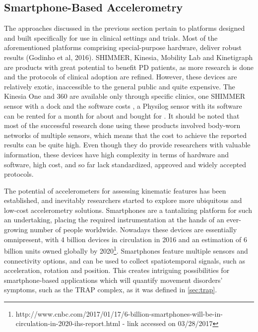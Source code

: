 
\subsection{Smartphone-Based Accelerometry}
\label{subsec:smartphones}
The approaches discussed in the previous section pertain to platforms designed and built specifically for use in clinical settings and trials. Most of the aforementioned platforms comprising special-purpose hardware, deliver robust results (Godinho et al, 2016). \gls{SHIMMER}, Kinesia, Mobility Lab and Kinetigraph are products with great potential to benefit \gls{PD} patients, as more research is done and the protocols of clinical adoption are refined. However, these devices are relatively exotic, inaccessible to the general public and quite expensive. The Kinesia One and 360 are available only through specific clinics, one \gls{SHIMMER} sensor with a dock and the software costs , a Physilog sensor with its software can be rented for a month for about  and bought for . It should be noted that most of the successful research done using these products involved body-worn networks of multiple sensors, which means that the cost to achieve the reported results can be quite high. Even though they do provide researchers with valuable information, these devices have high complexity in terms of hardware and software, high cost, and so far lack standardized, approved and widely accepted protocols.

The potential of accelerometers for assessing kinematic features has been established, and inevitably researchers started to explore more ubiquitous and low-cost accelerometry solutions. Smartphones are a tantalizing platform for such an undertaking, placing the required instrumentation at the hands of an ever-growing number of people worldwide. Nowadays these devices are essentially omnipresent, with \textcolor{BurntOrange}{4 billion devices in circulation} in 2016 and an estimation of \textcolor{BurntOrange}{6 billion units owned globally by 2020}\footnote{http://www.cnbc.com/2017/01/17/6-billion-smartphones-will-be-in-circulation-in-2020-ihs-report.html - link accessed on 03/28/2017}. Smartphones feature multiple sensors and connectivity options, and can be used to collect spatiotemporal signals, such as acceleration, rotation and position. This creates intriguing possibilities for smartphone-based applications which will quantify movement disorders' symptoms, such as the \gls{TRAP} complex, as it was defined in \ref{sec:trap}.

